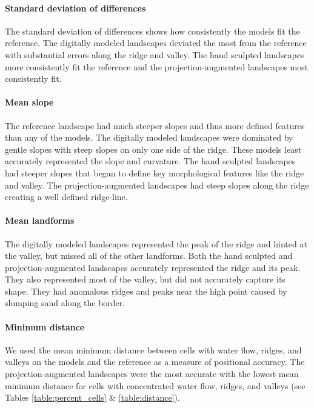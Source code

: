 \documentclass[prodmode,acmtochi]{acmsmall} %
\begin{document}
\paragraph{Standard deviation of differences}
The standard deviation of differences shows 
how consistently the models fit the reference. 
%
The digitally modeled landscapes deviated the most from the reference
with substantial errors along the ridge and valley. 
%
The hand sculpted landscapes 
more consistently fit the reference
and
the projection-augmented landscapes 
most consistently fit. 

\paragraph{Mean slope}
The reference landscape had 
much steeper slopes and thus more 
defined features
than any of the models.
%
The digitally modeled landscapes
were dominated by gentle slopes
with steep slopes on only one side of the ridge.
These models
least accurately represented the slope and curvature.
% 
The hand sculpted landscapes 
had steeper slopes
that began to define key morphological features 
like the ridge and valley.
%
The projection-augmented landscapes 
had steep slopes along the ridge
creating a well defined ridge-line. 

\paragraph{Mean landforms}
The digitally modeled landscapes
represented the peak of the ridge
and hinted at the valley, 
but missed all of the other landforms.
% 
Both the hand sculpted and projection-augmented landscapes 
accurately represented the ridge and its peak.
They also represented most of the valley,
but did not accurately capture its shape. 
They had anomalous ridges and peaks 
near the high point
caused by slumping sand along the border.

\paragraph{Minimum distance}
We used
the mean minimum distance between cells
with water flow, ridges, and valleys
on the models and the reference
as a measure of positional accuracy. 
%
The projection-augmented landscapes 
were the most accurate
with the lowest mean minimum distance for cells with
concentrated water flow, ridges, and valleys
(see Tables \ref{table:percent_cells} \& \ref{table:distance}). 
\end{document}
